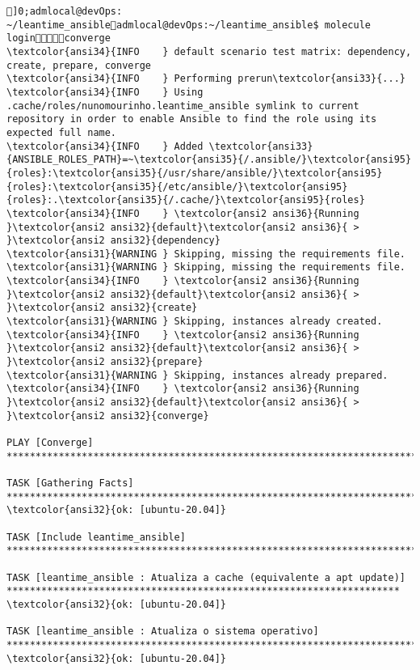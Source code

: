 \documentclass{scrartcl}
\begin{document}
\begin{Verbatim}
]0;admlocal@devOps: ~/leantime_ansibleadmlocal@devOps:~/leantime_ansible$ molecule loginconverge
\textcolor{ansi34}{INFO    } default scenario test matrix: dependency, create, prepare, converge
\textcolor{ansi34}{INFO    } Performing prerun\textcolor{ansi33}{...}
\textcolor{ansi34}{INFO    } Using .cache/roles/nunomourinho.leantime_ansible symlink to current repository in order to enable Ansible to find the role using its expected full name.
\textcolor{ansi34}{INFO    } Added \textcolor{ansi33}{ANSIBLE_ROLES_PATH}=~\textcolor{ansi35}{/.ansible/}\textcolor{ansi95}{roles}:\textcolor{ansi35}{/usr/share/ansible/}\textcolor{ansi95}{roles}:\textcolor{ansi35}{/etc/ansible/}\textcolor{ansi95}{roles}:.\textcolor{ansi35}{/.cache/}\textcolor{ansi95}{roles}
\textcolor{ansi34}{INFO    } \textcolor{ansi2 ansi36}{Running }\textcolor{ansi2 ansi32}{default}\textcolor{ansi2 ansi36}{ > }\textcolor{ansi2 ansi32}{dependency}
\textcolor{ansi31}{WARNING } Skipping, missing the requirements file.
\textcolor{ansi31}{WARNING } Skipping, missing the requirements file.
\textcolor{ansi34}{INFO    } \textcolor{ansi2 ansi36}{Running }\textcolor{ansi2 ansi32}{default}\textcolor{ansi2 ansi36}{ > }\textcolor{ansi2 ansi32}{create}
\textcolor{ansi31}{WARNING } Skipping, instances already created.
\textcolor{ansi34}{INFO    } \textcolor{ansi2 ansi36}{Running }\textcolor{ansi2 ansi32}{default}\textcolor{ansi2 ansi36}{ > }\textcolor{ansi2 ansi32}{prepare}
\textcolor{ansi31}{WARNING } Skipping, instances already prepared.
\textcolor{ansi34}{INFO    } \textcolor{ansi2 ansi36}{Running }\textcolor{ansi2 ansi32}{default}\textcolor{ansi2 ansi36}{ > }\textcolor{ansi2 ansi32}{converge}

PLAY [Converge] **************************************************************************************************************************

TASK [Gathering Facts] *******************************************************************************************************************
\textcolor{ansi32}{ok: [ubuntu-20.04]}

TASK [Include leantime_ansible] **********************************************************************************************************

TASK [leantime_ansible : Atualiza a cache (equivalente a apt update)] ********************************************************************
\textcolor{ansi32}{ok: [ubuntu-20.04]}

TASK [leantime_ansible : Atualiza o sistema operativo] ***********************************************************************************
\textcolor{ansi32}{ok: [ubuntu-20.04]}


\end{Verbatim}
\end{document}
